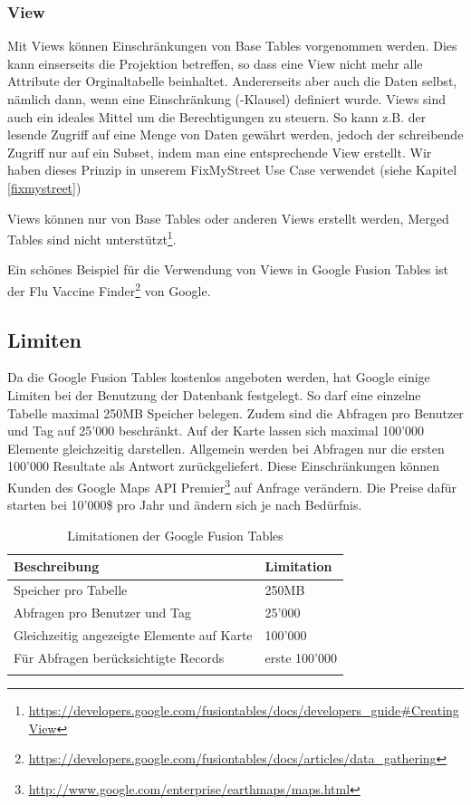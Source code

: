 \subsubsection{View}
Mit Views können Einschränkungen von Base Tables vorgenommen werden. Dies kann einserseits die Projektion betreffen, so dass eine View nicht mehr alle Attribute der Orginaltabelle beinhaltet. Andererseits aber auch die Daten selbst, nämlich dann, wenn eine Einschränkung (-Klausel) definiert wurde. Views sind auch ein ideales Mittel um die Berechtigungen zu steuern. So kann z.B. der lesende Zugriff auf eine Menge von Daten gewährt werden, jedoch der schreibende Zugriff nur auf ein Subset, indem man eine entsprechende View erstellt. Wir haben dieses Prinzip in unserem FixMyStreet Use Case verwendet (siehe Kapitel \ref{fixmystreet})

Views können nur von Base Tables oder anderen Views erstellt werden, \gls{Merge}d Tables sind nicht unterstützt\footnote{\url{https://developers.google.com/fusiontables/docs/developers_guide\#CreatingView}}.

Ein schönes Beispiel für die Verwendung von Views in Google Fusion Tables ist der Flu Vaccine Finder\footnote{\url{https://developers.google.com/fusiontables/docs/articles/data_gathering}} von Google.

\subsection{Limiten}
Da die Google Fusion Tables kostenlos angeboten werden, hat Google einige Limiten bei der Benutzung der Datenbank festgelegt. So darf eine einzelne Tabelle maximal 250MB Speicher belegen. Zudem sind die Abfragen pro Benutzer und Tag auf 25'000 beschränkt. Auf der Karte lassen sich maximal 100'000 Elemente gleichzeitig darstellen. Allgemein werden bei Abfragen nur die ersten 100'000 Resultate als Antwort zurückgeliefert. Diese Einschränkungen können Kunden des Google Maps API Premier\footnote{\url{http://www.google.com/enterprise/earthmaps/maps.html}} auf Anfrage verändern. Die Preise dafür starten bei 10'000\$ pro Jahr und ändern sich je nach Bedürfnis.\cite{fusion-tables-geo-limits}

\begin{longtable}{|l|l|}
\hline 
\textbf{Beschreibung} & \textbf{Limitation} \\ 
\hline 
Speicher pro Tabelle & 250MB \\ 
\hline 
Abfragen pro Benutzer und Tag & 25'000 \\ 
\hline 
Gleichzeitig angezeigte Elemente auf Karte & 100'000 \\ 
\hline 
Für Abfragen berücksichtigte Records & erste 100'000 \\ 
\hline 
\caption{Limitationen der Google Fusion Tables}
\label{gft-limitations}
\end{longtable} 

